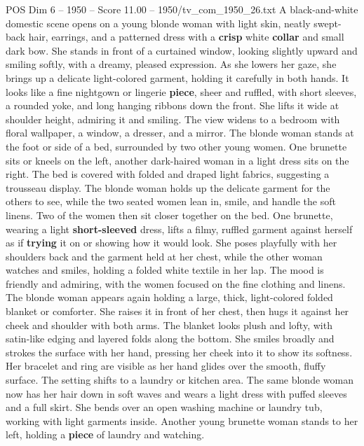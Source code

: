 \begin{textsample}{POS Dim 6 – 1950 – Score 11.00 – 1950/tv\_com\_1950\_26.txt}  \label{ex:f6_pos_016}
A black-and-white domestic scene opens on a young blonde woman with light skin, neatly swept-back hair, earrings, and a patterned dress with a \textbf{crisp} white \textbf{collar} and small dark bow.
She stands in front of a curtained window, looking slightly upward and smiling softly, with a dreamy, pleased expression.
As she lowers her gaze, she brings up a delicate light-colored garment, holding it carefully in both hands.
It looks like a fine nightgown or lingerie \textbf{piece}, sheer and ruffled, with short sleeves, a rounded yoke, and long hanging ribbons down the front.
She lifts it wide at shoulder height, admiring it and smiling.
The view widens to a bedroom with floral wallpaper, a window, a dresser, and a mirror.
The blonde woman stands at the foot or side of a bed, surrounded by two other young women.
One brunette sits or kneels on the left, another dark-haired woman in a light dress sits on the right.
The bed is covered with folded and draped light fabrics, suggesting a trousseau display.
The blonde woman holds up the delicate garment for the others to see, while the two seated women lean in, smile, and handle the soft linens.
Two of the women then sit closer together on the bed.
One brunette, wearing a light \textbf{short-sleeved} dress, lifts a filmy, ruffled garment against herself as if \textbf{trying} it on or showing how it would look.
She poses playfully with her shoulders back and the garment held at her chest, while the other woman watches and smiles, holding a folded white textile in her lap.
The mood is friendly and admiring, with the women focused on the fine clothing and linens.
The blonde woman appears again holding a large, thick, light-colored folded blanket or comforter.
She raises it in front of her chest, then hugs it against her cheek and shoulder with both arms.
The blanket looks plush and lofty, with satin-like edging and layered folds along the bottom.
She smiles broadly and strokes the surface with her hand, pressing her cheek into it to show its softness.
Her bracelet and ring are visible as her hand glides over the smooth, fluffy surface.
The setting shifts to a laundry or kitchen area.
The same blonde woman now has her hair down in soft waves and wears a light dress with puffed sleeves and a full skirt.
She bends over an open washing machine or laundry tub, working with light garments inside.
Another young brunette woman stands to her left, holding a \textbf{piece} of laundry and watching.

\end{textsample}
